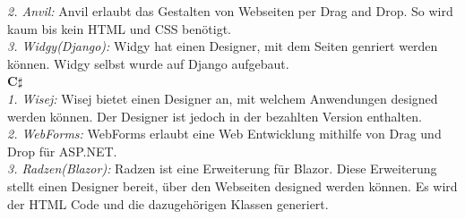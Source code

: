 \documentclass[ngerman]{article}
\begin{document}
    \textit{2. Anvil:} Anvil erlaubt das Gestalten von Webseiten per Drag and Drop. So wird kaum bis kein HTML und CSS benötigt. \cite{PythonAnvil}\\
    \textit{3. Widgy(Django):} Widgy hat einen Designer, mit dem Seiten genriert werden können. Widgy selbst wurde auf Django aufgebaut. \cite{Python Widgy}\\
    \textbf{C$\sharp$}\\
    \textit{1. Wisej:} Wisej bietet einen Designer an, mit welchem Anwendungen designed werden können. Der Designer ist jedoch in der bezahlten Version enthalten. \cite{CSharp Wisej}\\
    \textit{2. WebForms:} WebForms erlaubt eine Web Entwicklung mithilfe von Drag und Drop für ASP.NET. \cite{WebForms1}\\
    \textit{3. Radzen(Blazor):} Radzen ist eine Erweiterung für Blazor. Diese Erweiterung stellt einen Designer bereit, über den Webseiten designed werden können. Es wird der HTML Code und die dazugehörigen Klassen generiert. \cite{CSharpRadzen}\\
\end{document}
